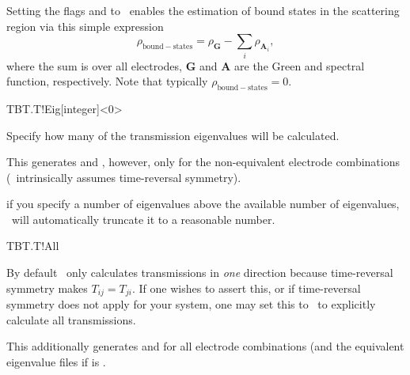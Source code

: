Setting the flags  and  to
\fdftrue\ enables the estimation of bound states in the scattering
region via this simple expression
\begin{equation}
  \rho_{\mathrm{bound-states}} = \rho_{\mathbf G} - 
  \sum_i \rho_{\mathbf A_i},
\end{equation}
where the sum is over all electrodes, $\mathbf G$ and $\mathbf A$ are
the Green and spectral function, respectively. Note that typically
$\rho_{\mathrm{bound-states}}=0$. 

\begin{fdfentry}{TBT.T!Eig}[integer]<0>

  Specify how many of the transmission eigenvalues will be
  calculated. 

  This generates  and
  , however, only for the non-equivalent
  electrode combinations (\tbtrans\ intrinsically assumes
  time-reversal symmetry).

  \note if you specify a number of eigenvalues above the available
  number of eigenvalues, \tbtrans\ will automatically truncate it to a
  reasonable number.

\end{fdfentry}

\begin{fdflogicalF}{TBT.T!All}

  By default \tbtrans\ only calculates transmissions in \emph{one}
  direction because time-reversal symmetry makes $T_{ij}=T_{ji}$. If
  one wishes to assert this, or if time-reversal symmetry does not
  apply for your system, one may set this to \fdftrue\ to explicitly
  calculate all transmissions.

  This additionally generates  and
   for all electrode combinations (and the
  equivalent eigenvalue files if  is \fdftrue.

\end{fdflogicalF}

